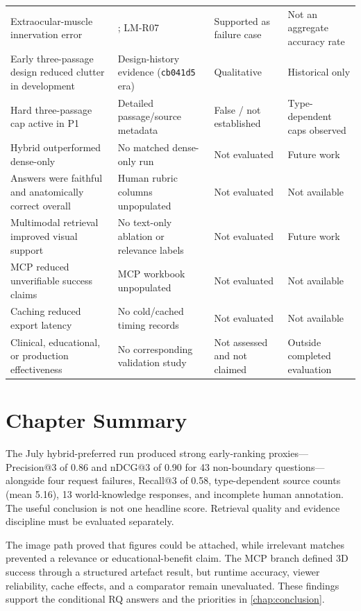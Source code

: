 {\begin{longtable}{L{0.27\textwidth}L{0.25\textwidth}L{0.15\textwidth}L{0.21\textwidth}}
Extraocular-muscle innervation error & ; LM-R07 & Supported as failure case & Not an aggregate accuracy rate \\
Early three-passage design reduced clutter in development & Design-history evidence (\texttt{cb041d5} era) & Qualitative & Historical only \\
Hard three-passage cap active in P1 & Detailed passage/source metadata & False / not established & Type-dependent caps observed \\
Hybrid outperformed dense-only & No matched dense-only run & Not evaluated & Future work \\
Answers were faithful and anatomically correct overall & Human rubric columns unpopulated & Not evaluated & Not available \\
Multimodal retrieval improved visual support & No text-only ablation or relevance labels & Not evaluated & Future work \\
MCP reduced unverifiable success claims & MCP workbook unpopulated & Not evaluated & Not available \\
Caching reduced export latency & No cold/cached timing records & Not evaluated & Not available \\
Clinical, educational, or production effectiveness & No corresponding validation study & Not assessed and not claimed & Outside completed evaluation \\
\bottomrule
\end{longtable}
}

\section{Chapter Summary}
\label{sec:results-summary}

The July hybrid-preferred run produced strong early-ranking proxies---Precision@3 of 0.86 and nDCG@3 of 0.90 for 43 non-boundary questions---alongside four request failures, Recall@3 of 0.58, type-dependent source counts (mean 5.16), 13 world-knowledge responses, and incomplete human annotation. The useful conclusion is not one headline score. Retrieval quality and evidence discipline must be evaluated separately.

The image path proved that figures could be attached, while irrelevant matches prevented a relevance or educational-benefit claim. The MCP branch defined 3D success through a structured artefact result, but runtime accuracy, viewer reliability, cache effects, and a comparator remain unevaluated. These findings support the conditional RQ answers and the priorities in \cref{chap:conclusion}.
